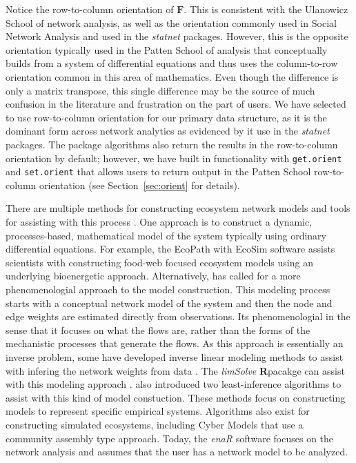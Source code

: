 \documentclass[article]{jss}
\newcommand{\R}{\textbf{R}}
\begin{document}
Notice the row-to-column orientation of $\mathbf{F}$.  This is
consistent with the Ulanowicz School of network analysis, as well as
the orientation commonly used in Social Network Analysis and used in
the \textit{statnet} packages.  However, this is the opposite
orientation typically used in the Patten School of analysis that
conceptually builds from a system of differential equations and thus
uses the column-to-row orientation common in this area of
mathematics. Even though the difference is only a matrix transpose,
this single difference may be the source of much confusion in the
literature and frustration on the part of users.  We have selected to
use row-to-column orientation for our primary data structure, as it is
the dominant form across network analytics as evidenced by it use in
the \textit{statnet} packages. The package algorithms also return the
results in the row-to-column orientation by default; however, we have
built in functionality with \texttt{get.orient} and
\texttt{set.orient} that allows users to return output in the Patten
School row-to-column orientation (see Section~\ref{sec:orient} for
details).

There are multiple methods for constructing ecosystem network models
and tools for assisting with this process
\citep{fath07_netconstruction}.  One approach is to construct a
dynamic, processes-based, mathematical model of the system typically
using ordinary differential equations.  For example, the EcoPath with
EcoSim \citep{christensen92, christensen95} software assists
scientists with constructing food-web focused ecosystem models using
an underlying bioenergetic approach.  Alternatively,
\citet{ulanowicz86} has called for a more phenomenologial approach to
the model construction.  This modeling process starts with a
conceptual network model of the system and then the node and edge
weights are estimated directly from observations.  Its phenomenologial
in the sense that it focuses on what the flows are, rather than the
forms of the mechanistic processes that generate the flows.  As this
approach is essentially an inverse problem, some have developed
inverse linear modeling methods to assist with infering the network
weights from data \citep{vezina1988, vanoevelen2010}.  The
\textit{limSolve} \R pacakge can assist with this modeling approach
\citep{soetaert09}.  \citet{ulanowicz2008least} also introduced two
least-inference algorithms to assist with this kind of model
constuction.  These methods focus on constructing models to represent
specific empirical systems.  Algorithms also exist for constructing
simulated ecosystems, including  Cyber Models that
use a community assembly type approach. Today, the \textit{enaR}
software focuses on the network analysis and assumes that the user has
a network model to be analyzed.
\end{document}
